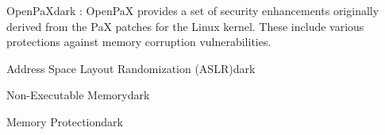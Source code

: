 \label{OpenPaX}

\begin{baseBoxThree}{OpenPaX}{dark}
    \bigskip
    : OpenPaX provides a set of security enhancements originally derived from the PaX patches for the Linux kernel.
    These include various protections against memory corruption vulnerabilities.
    \bigskip
    \begin{baseBoxThree}{Address Space Layout Randomization (ASLR)}{dark}

    \end{baseBoxThree}
    \smallskip
    \begin{baseBoxThree}{Non-Executable Memory}{dark}
    
    \end{baseBoxThree}
    \smallskip
    \begin{baseBoxThree}{Memory Protection}{dark}
    
    \end{baseBoxThree}
    \smallskip
\end{baseBoxThree}
